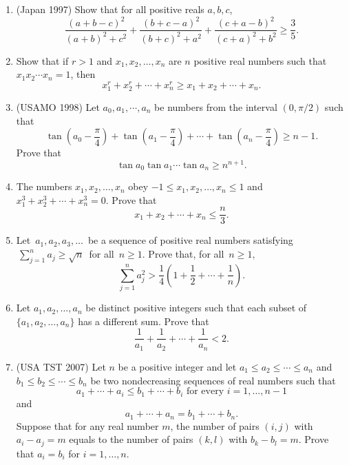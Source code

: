 \documentclass[11pt]{article}
\begin{document}
\begin{enumerate}
  \item (Japan 1997) Show that for all positive reals $a,b,c$, 
  \[ \frac{(a+b-c)^2}{(a+b)^2+c^2} + \frac{(b+c-a)^2}{(b+c)^2 + a^2} + \frac{(c+a-b)^2}{(c+a)^2 + b^2} \geq \frac{3}{5}. \]
  
  \item Show that if $r > 1$ and $x_1, x_2, \ldots, x_n$ are $n$ positive real numbers such that $x_1 x_2 \cdots x_n = 1$, then 
  \[ x_1^r + x_2^r + \cdots + x_n^r \geq x_1 + x_2 + \cdots + x_n. \]
    
  \item (USAMO 1998) Let $a_0,a_1,\cdots ,a_n$ be numbers from the interval $(0,\pi/2)$ such that \[ \tan (a_0-\frac{\pi}{4})+ \tan (a_1-\frac{\pi}{4})+\cdots +\tan (a_n-\frac{\pi}{4})\geq n-1.  \] Prove that \[ \tan a_0\tan a_1 \cdots \tan a_n \geq n^{n+1}.  \]
  
  \item The numbers $x_1, x_2, \ldots, x_n$ obey $-1 \leq x_1, x_2, \ldots, x_n \leq 1$ and $x_1^3 + x_2^3 + \cdots + x_n^3 = 0$. Prove that \[ x_1 + x_2 + \cdots + x_n \leq \frac{n}{3}. \]
   
  \item Let $\, a_1, a_2, a_3, \ldots \,$ be a sequence of positive real numbers satisfying $\, \sum_{j=1}^n a_j \geq \sqrt{n} \,$ for all $\, n \geq 1$. Prove that, for all $\, n \geq 1, \,$  \[ \sum_{j=1}^n a_j^2 > \frac{1}{4} \left( 1 + \frac{1}{2} + \cdots + \frac{1}{n} \right).  \]
  
  \item Let $a_1, a_2, \ldots, a_n$ be distinct positive integers such that each subset of $\{a_1, a_2, \ldots, a_n\}$ has a different sum. Prove that \[ \frac{1}{a_1} + \frac{1}{a_2} +  \cdots + \frac{1}{a_n} < 2. \]
  
  \item (USA TST 2007) Let $ n$ be a positive integer and let $ a_1 \leq a_2 \leq \cdots \leq a_n$ and $ b_1 \leq b_2 \leq \cdots \leq b_n$ be two nondecreasing sequences of real numbers such that
\[ a_1 + \cdots + a_i \leq b_1 + \cdots + b_i \text{ for every } i = 1,\ldots,n - 1 \]
and
\[ a_1 + \cdots + a_n = b_1 + \cdots + b_n. \]
Suppose that for any real number $ m$, the number of pairs $ (i,j)$ with $ a_i - a_j = m$ equals to the number of pairs $ (k,l)$ with $ b_k - b_l = m$. Prove that $ a_i = b_i$ for $ i = 1,\ldots,n$.



\end{enumerate}
\end{document}
